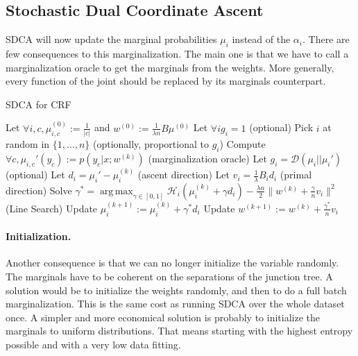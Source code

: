 \documentclass{article}
\DeclareMathOperator{\1}{\mathbb{1}}
\DeclareMathOperator*{\argmax}{arg\,max}
\begin{document}
\subsection{Stochastic Dual Coordinate Ascent}
SDCA will now update the marginal probabilities $\mu_i$ instead of the $\alpha_i$. 
There are few consequences to this marginalization.
The main one is that we have to call a marginalization oracle to get the marginals from the weights.
More generally, every function of the joint should be replaced by its marginals counterpart. 

\begin{algorithm}[ht]
    \caption{SDCA for CRF}%
    \label{sdca for crf}
\begin{algorithmic}
        \STATE Let $\forall i, c, \mu_{i, c}^{(0)} := \frac{1}{|c|}$ and $w^{(0)} := \frac{1}{\lambda n} B \mu^{(0)} $
        \STATE Let $\forall i g_i = 1$ (optional)
                \STATE Pick $i$ at random in $\{1,\ldots,n\}$ (optionally, proportional to $g_i$)
                \STATE Compute $\forall c, \mu_{i, c}' (y_c) := p(y_c|x; w^{(k)})$ (marginalization oracle)
                \STATE Let $g_i = \mathcal D(\mu_i || \mu_i')$ (optional)
                \STATE Let $d_i = \mu_i' - \mu_i^{(k)}$ (ascent direction)
                \STATE Let $v_i = \frac{1}{\lambda} B_i d_i $ (primal direction)
                \STATE Solve $\gamma^* = \argmax_{\gamma \in [0,1]} \mathcal H_i(\mu_i^{(k)} + \gamma d_i) - \frac{\lambda n}{2} \| w^{(k)} + \frac{\gamma}{n} v_i \|^2$ (Line Search)
               \STATE Update $\mu_i^{(k+1)} := \mu_i^{(k)} + \gamma^* d_i$
               \STATE Update $w^{(k+1)} := w^{(k)} + \frac{\gamma^*}{n} v_i $
        \ENDFOR
\end{algorithmic}
\end{algorithm}

\paragraph{Initialization.}
Another consequence is that we can no longer initialize the variable randomly. 
The marginals have to be coherent on the separations of the junction tree.
A solution would be to initialize the weights randomly, and then to do a full batch marginalization.
This is the same cost as running SDCA over the whole dataset once.
A simpler and more economical solution is probably to initialize the marginals to uniform distributions.
That means starting with the highest entropy possible and with a very low data fitting.
\end{document}
